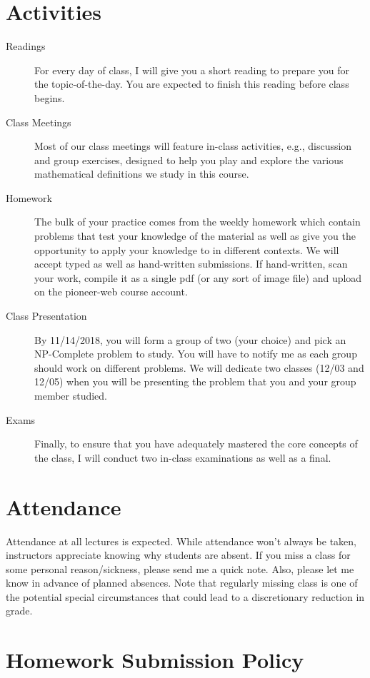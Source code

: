 \documentclass[twoside]{article}
\begin{document}
\section{Activities}
\begin{description}
\item [Readings] For every day of class, I will give you a short reading to prepare you for the topic-of-the-day.
  You are expected to finish this reading before class begins.
\item [Class Meetings] Most of our class meetings will feature in-class activities, e.g., discussion and group exercises, designed to help you play and explore the various mathematical definitions we study in this course.
\item [Homework] The bulk of your practice comes from the weekly homework which contain problems that test your knowledge of the material as well as give you the opportunity to apply your knowledge to in different contexts. We will accept typed as well as hand-written submissions. If hand-written, scan your work, compile it as a single pdf (or any sort of image file) and upload on the pioneer-web course account. 
\item [Class Presentation] By 11/14/2018, you will form a group of two (your choice) and pick an NP-Complete problem to study. You will have to notify me as each group should work on different problems. We will dedicate two classes (12/03 and 12/05) when you will be presenting the problem that you and your group member studied. 
\item [Exams] Finally, to ensure that you have adequately mastered the core concepts of the class, I will conduct two in-class examinations as well as a final.
\end{description}

\section{Attendance}
Attendance at all lectures is expected. While attendance won't always be taken, instructors appreciate knowing why students are absent. If you miss a class for some personal reason/sickness, please send me a quick note. Also, please let me know in advance of planned absences. Note that regularly missing class is one of the potential special circumstances that could lead to a discretionary reduction in grade.

\section{Homework Submission Policy}
\end{document}
